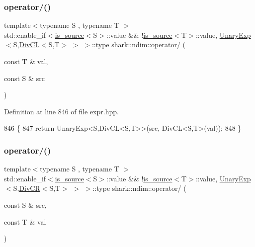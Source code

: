 \subsubsection{\texorpdfstring{operator/()}{operator/()}\hspace{0.1cm}{\footnotesize\ttfamily [3/5]}}
{\footnotesize\ttfamily template$<$typename S , typename T $>$ \\
std\+::enable\+\_\+if$<$\hyperlink{classshark_1_1ndim_1_1is__source}{is\+\_\+source}$<$S$>$\+::value \&\& !\hyperlink{classshark_1_1ndim_1_1is__source}{is\+\_\+source}$<$T$>$\+::value, \hyperlink{classshark_1_1ndim_1_1_unary_exp}{Unary\+Exp}$<$S,\hyperlink{classshark_1_1ndim_1_1_div_c_l}{Div\+CL}$<$S,T$>$ $>$ $>$\+::type shark\+::ndim\+::operator/ (\begin{DoxyParamCaption}\item[{const T \&}]{val,  }\item[{const S \&}]{src }\end{DoxyParamCaption})}



Definition at line 846 of file expr.\+hpp.


\begin{DoxyCode}
846                                                                                                            
                                    \{
847             \textcolor{keywordflow}{return} UnaryExp<S,DivCL<S,T>>(src, DivCL<S,T>(val));
848         \}
\end{DoxyCode}
\hypertarget{namespaceshark_1_1ndim_a04db7e72d5f7d75e493d397e6ee1b973}{}\label{namespaceshark_1_1ndim_a04db7e72d5f7d75e493d397e6ee1b973} 
\subsubsection{\texorpdfstring{operator/()}{operator/()}\hspace{0.1cm}{\footnotesize\ttfamily [4/5]}}
{\footnotesize\ttfamily template$<$typename S , typename T $>$ \\
std\+::enable\+\_\+if$<$\hyperlink{classshark_1_1ndim_1_1is__source}{is\+\_\+source}$<$S$>$\+::value \&\& !\hyperlink{classshark_1_1ndim_1_1is__source}{is\+\_\+source}$<$T$>$\+::value, \hyperlink{classshark_1_1ndim_1_1_unary_exp}{Unary\+Exp}$<$S,\hyperlink{classshark_1_1ndim_1_1_div_c_r}{Div\+CR}$<$S,T$>$ $>$ $>$\+::type shark\+::ndim\+::operator/ (\begin{DoxyParamCaption}\item[{const S \&}]{src,  }\item[{const T \&}]{val }\end{DoxyParamCaption})}



